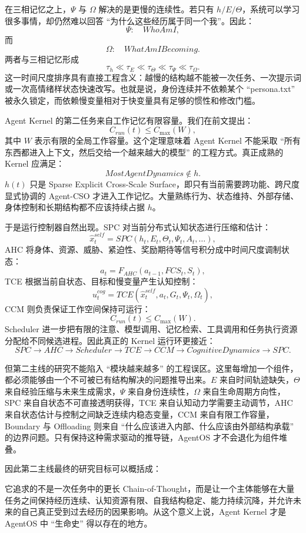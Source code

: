 在三相记忆之上，$\Psi$ 与 $\Omega$ 解决的是更慢的连续性。若只有 $h/E/\Theta$，系统可以学习很多事情，却仍然难以回答 ``为什么这些经历属于同一个我''。因此：
\[
\Psi:\quad WhoAmI,
\]
而
\[
\Omega:\quad WhatAmIBecoming.
\]
两者与三相记忆形成
\[
\tau_h
\ll
\tau_E
\ll
\tau_\Theta
\ll
\tau_\Psi
\ll
\tau_\Omega .
\]
这一时间尺度排序具有直接工程含义：越慢的结构越不能被一次任务、一次提示词或一次高情绪样状态快速改写。也就是说，身份连续并不依赖某个 ``persona.txt'' 被永久锁定，而依赖慢变量相对于快变量具有足够的惯性和修改门槛。

Agent Kernel 的第二任务来自工作记忆有限容量。我们在前文提出：
\[
C_{run}(t)\leq C_{\max}(W),
\]
其中 $W$ 表示有限的全局工作容量。这个定理意味着 Agent Kernel 不能采取 ``所有东西都进入上下文，然后交给一个越来越大的模型'' 的工程方式。真正成熟的 Kernel 应满足：
\[
\boxed{
MostAgentDynamics\notin h.
}
\]
$h(t)$ 只是 Sparse Explicit Cross-Scale Surface，即只有当前需要跨功能、跨尺度显式协调的 Agent-CSO 才进入工作记忆。大量熟练行为、状态维持、外部存储、身体控制和长期结构都不应该持续占据 $h$。

于是运行控制器自然出现。SPC 对当前分布式认知状态进行压缩和估计：
\[
\hat x^{self}_t
=
SPC
\left(
h_t,E_t,\Theta_t,\Psi_t,A_t,\ldots
\right),
\]
AHC 将身体、资源、威胁、紧迫性、奖励期待等信号积分成中时间尺度调制状态：
\[
a_t
=
F_{AHC}
(a_{t-1},FCS_t,S_t),
\]
TCE 根据当前自状态、目标和慢变量产生认知控制：
\[
u^{cog}_t
=
TCE
\left(
\hat x^{self}_t,a_t,G_t,\Psi_t,\Omega_t
\right),
\]
CCM 则负责保证工作空间保持可运行：
\[
C_{run}(t)\leq C_{\max}(W).
\]
Scheduler 进一步把有限的注意、模型调用、记忆检索、工具调用和任务执行资源分配给不同候选进程。因此真正的 Kernel 运行环更接近：
\[
SPC
\rightarrow
AHC
\rightarrow
Scheduler
\rightarrow
TCE
\rightarrow
CCM
\rightarrow
CognitiveDynamics
\rightarrow
SPC.
\]

但第二主线的研究不能陷入 ``模块越来越多'' 的工程误区。这里每增加一个组件，都必须能够由一个不可被已有结构解决的问题推导出来。$E$ 来自时间轨迹缺失，$\Theta$ 来自经验压缩与未来生成需求，$\Psi$ 来自身份连续性，$\Omega$ 来自生命周期方向性，SPC 来自自状态不可直接透明获得，TCE 来自认知动力学需要主动调节，AHC 来自状态估计与控制之间缺乏连续内稳态变量，CCM 来自有限工作容量，Boundary 与 Offloading 则来自 ``什么应该进入内部、什么应该由外部结构承载'' 的边界问题。只有保持这种需求驱动的推导链，AgentOS 才不会退化为组件堆叠。

因此第二主线最终的研究目标可以概括成：
\begin{statementbox}
\centering
{}
\end{statementbox}
它追求的不是一次任务中的更长 Chain-of-Thought，而是让一个主体能够在大量任务之间保持经历连续、认知资源有限、自我结构稳定、能力持续沉降，并允许未来的自己真正受到过去经历的因果影响。从这个意义上说，Agent Kernel 才是 AgentOS 中 ``生命史'' 得以存在的地方。

